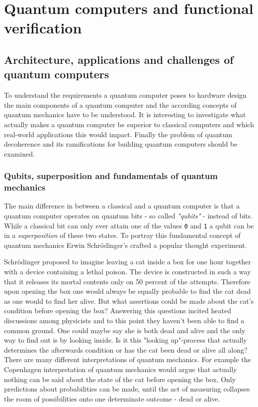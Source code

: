 
\chapter{Quantum computers and functional verification}

\section{Architecture, applications and challenges of quantum computers}

To understand the requirements a quantum computer poses to hardware design the main components of a quantum computer and the according concepts of quantum mechanics have to be understood. It is interesting to investigate what actually makes a quantum computer be superior to classical computers and which real-world applications this would impact. Finally the problem of quantum decoherence and its ramifications for building quantum computers should be examined.

\subsection{Qubits, superposition and fundamentals of quantum mechanics}

The main difference in between a classical and a quantum computer is that a quantum computer operates on quantum bits - so called \textit{"qubits"} - instead of bits. While a classical bit can only ever attain one of the values \texttt{0} and \texttt{1} a qubit can be in a \textit{superposition} of these two states. To portray this fundamental concept of quantum mechanics Erwin Schrödinger's crafted a popular thought experiment.

Schrödinger proposed to imagine leaving a cat inside a box for one hour together with a device containing a lethal poison. The device is constructed in such a way that it releases its mortal contents only on 50 percent of the attempts. Therefore upon opening the box one would always be equally probable to find the cat dead as one would to find her alive. \cite[see][p. 812]{Schr35} But what assertions could be made about the cat's condition before opening the box? Answering this questions incited heated discussions among physicists and to this point they haven't been able to find a common ground. One could maybe say she is both dead and alive and the only way to find out is by looking inside. Is it this "looking up"-process that actually determines the afterwards condition or has the cat been dead or alive all along? There are many different interpretations of quantum mechanics. For example the Copenhagen interpretation of quantum mechanics would argue that actually nothing can be said about the state of the cat before opening the box. Only predictions about probabilities can be made, until the act of measuring collapses the room of possibilities onto one determinate outcome - dead or alive.

